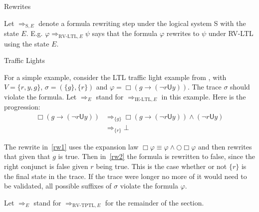 \documentclass[a4paper]{article}
\newcommand{\U}{\mathsf{U}}
\newcommand{\rw}[1]{\Rightarrow_{#1}}
\begin{document}
\begin{notn}{Rewrites}

  Let $\rw{\text{S},E}$ denote a formula rewriting step under the logical system S with the state $E$. E.g. $\varphi\rw{\text{RV-LTL},E}\psi$ says that the formula $\varphi$ rewrites to $\psi$ under RV-LTL using the state $E$.
\end{notn}

\begin{eg}{Traffic Lights}

  For a simple example, consider the LTL traffic light example from \textcite[175]{rosu2005rewriting}, with $V=\{r,y,g\}$, $\sigma = (\{g\},\{r\})$ and $\varphi = \Box (g \to (\neg r \U y))$. The trace $\sigma$ should violate the formula. Let $\rw{E}$ stand for $\rw{\text{IE-LTL},E}$ in this example. Here is the progression:
\begin{align}
  \Box (g \to (\neg r \U y)) &\rw{\{g\}} \Box (g \to (\neg r \U y)) \land (\neg r \U y)\label{rw1}\\
  &\rw{\{r\}} \bot\label{rw2}
\end{align}

The rewrite in~\eqref{rw1} uses the expansion law $\Box \varphi \equiv \varphi \land \bigcirc \Box \varphi$ and then rewrites that given that $g$ is true.
Then in~\eqref{rw2} the formula is rewritten to false, since the right conjunct is false given $r$ being true. This is the case whether or not $\{r\}$ is the final state in the trace. If the trace were longer no more of it would need to be validated, all possible suffixes of $\sigma$ violate the formula $\varphi$.
\end{eg}

Let $\rw{E}$ stand for $\rw{\text{RV-TPTL},E}$ for the remainder of the section.
\end{document}
